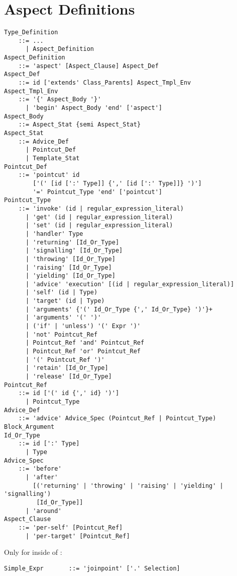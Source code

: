 \section{Aspect Definitions}
\label{sec:aspects}

\grammar\begin{lstlisting}
Type_Definition 
    ::= ...
      | Aspect_Definition
Aspect_Definition 
    ::= 'aspect' [Aspect_Clause] Aspect_Def
Aspect_Def
    ::= id ['extends' Class_Parents] Aspect_Tmpl_Env
Aspect_Tmpl_Env 
    ::= '{' Aspect_Body '}'
      | 'begin' Aspect_Body 'end' ['aspect']
Aspect_Body
    ::= Aspect_Stat {semi Aspect_Stat}
Aspect_Stat 
    ::= Advice_Def
      | Pointcut_Def
      | Template_Stat
Pointcut_Def 
    ::= 'pointcut' id
        ['(' [id [':' Type]] {',' [id [':' Type]]} ')']
        '=' Pointcut_Type 'end' ['pointcut']
Pointcut_Type 
    ::= 'invoke' (id | regular_expression_literal)
      | 'get' (id | regular_expression_literal)
      | 'set' (id | regular_expression_literal)
      | 'handler' Type
      | 'returning' [Id_Or_Type]
      | 'signalling' [Id_Or_Type]
      | 'throwing' [Id_Or_Type]
      | 'raising' [Id_Or_Type]
      | 'yielding' [Id_Or_Type]
      | 'advice' 'execution' [(id | regular_expression_literal)]
      | 'self' (id | Type)
      | 'target' (id | Type)
      | 'arguments' {'(' Id_Or_Type {',' Id_Or_Type} ')'}+
      | 'arguments' '(' ')'
      | ('if' | 'unless') '(' Expr ')'
      | 'not' Pointcut_Ref
      | Pointcut_Ref 'and' Pointcut_Ref
      | Pointcut_Ref 'or' Pointcut_Ref
      | '(' Pointcut_Ref ')'
      | 'retain' [Id_Or_Type]
      | 'release' [Id_Or_Type]
Pointcut_Ref 
    ::= id ['(' id {',' id} ')'] 
      | Pointcut_Type
Advice_Def 
    ::= 'advice' Advice_Spec (Pointcut_Ref | Pointcut_Type) Block_Argument
Id_Or_Type
    ::= id [':' Type] 
      | Type
Advice_Spec 
    ::= 'before' 
      | 'after' 
        [('returning' | 'throwing' | 'raising' | 'yielding' | 'signalling') 
         [Id_Or_Type]]
      | 'around'
Aspect_Clause
    ::= 'per-self' [Pointcut_Ref] 
      | 'per-target' [Pointcut_Ref] 
\end{lstlisting}

Only for  inside of :
\begin{lstlisting}
Simple_Expr       ::= 'joinpoint' ['.' Selection]
\end{lstlisting}








